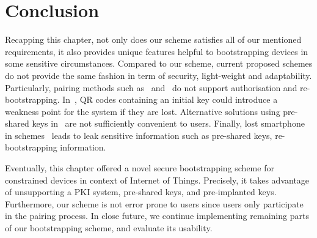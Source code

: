 \section{Conclusion}\label{conclusion}

Recapping this chapter, not only does our scheme satisfies all of our mentioned requirements, it also provides unique features helpful to bootstrapping devices in some sensitive circumstances. Compared to our scheme, current proposed schemes do not provide the same fashion in term of security, light-weight and adaptability. Particularly, pairing methods such as~\cite{4159919} and~\cite{5654588} do not support authorisation and re-bootstrapping. In~\cite{Seung2015, Jeanning2013}, QR codes containing an initial key could introduce a weakness point for the system if they are lost. Alternative solutions using pre-shared keys in~\cite{JCMjcm0708634642, Cha:2011:LSE:1968613.1968679, Ikram:2009:SLA:1582379.1582583, 6263790, rfc5191} are not sufficiently convenient to users. Finally, lost smartphone in schemes~\cite{Seung2015, 6934398} leads to leak sensitive information such as pre-shared keys, re-bootstrapping information.

Eventually, this chapter offered a novel secure bootstrapping scheme for constrained devices in context of Internet of Things. Precisely, it takes advantage of unsupporting a PKI system, pre-shared keys, and pre-implanted keys. Furthermore, our scheme is not error prone to users since users only participate in the pairing process. In close future, we continue implementing remaining parts of our bootstrapping scheme, and evaluate its usability.





